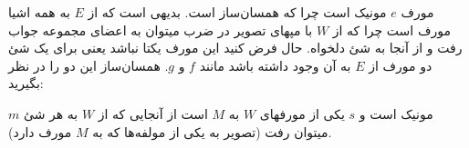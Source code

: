 مورف $e$ مونیک است چرا که همسان‌ساز است.
بدیهی است که از $E$ به همه اشیا مورف است چرا که از $W$ با مپهای تصویر در ضرب میتوان به اعضای مجموعه جواب رفت و از آنجا به شئ دلخواه.
حال فرض کنید این مورف یکتا نباشد یعنی برای یک شئ دو مورف از $E$ به آن وجود داشته باشد مانند $f$ و $g$. همسان‌ساز این دو را در نظر بگیرید:
\begin{center}
\end{center} 
$m$ مونیک است و $s$ یکی از مورفهای $W$ به $M$ است از آنجایی که از $W$ به هر شئ میتوان رفت (تصویر به یکی از مولفه‌ها که به $M$ مورف دارد).
